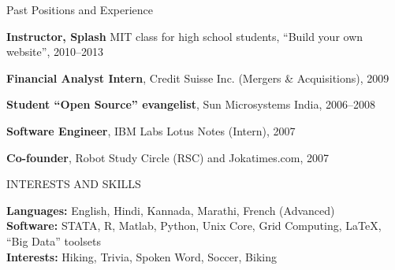 \documentclass{resume} %
\begin{document}

\begin{rSection}{Past Positions and Experience}

\begin{rSubsection}{}{}{}{}

\item \textbf{Instructor, Splash} MIT class for high school students, ``Build your own website'', 2010--2013
\item \textbf{Financial Analyst Intern}, Credit Suisse Inc. (Mergers \& Acquisitions), 2009
\item \textbf{Student ``Open Source'' evangelist}, Sun Microsystems India, 2006--2008
\item \textbf{Software Engineer}, IBM Labs Lotus Notes (Intern), 2007
\item \textbf{Co-founder}, Robot Study Circle (RSC) and Jokatimes.com, 2007

\end{rSubsection}

\end{rSection}


\newpage
\begin{rSection}{INTERESTS AND SKILLS}

{\bf Languages:} English, Hindi, Kannada, Marathi, French (Advanced) \\
{\bf Software:} STATA, R, Matlab, Python, Unix Core, Grid Computing, \LaTeX, ``Big Data'' toolsets \\
{\bf Interests:} Hiking, Trivia, Spoken Word, Soccer, Biking

\end{rSection}

\end{document}
